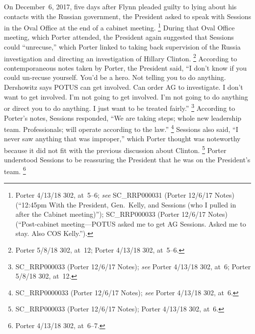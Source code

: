On December~6, 2017, five days after Flynn pleaded guilty to lying about his contacts with the Russian government, the President asked to speak with Sessions in the Oval Office at the end of a cabinet meeting.%
\footnote{Porter 4/13/18 302, at~5--6;
\textit{see} SC\_RRP000031 (Porter 12/6/17 Notes) (``12:45pm With the President, Gen.~Kelly, and Sessions (who I pulled in after the Cabinet meeting)'');
SC\_RRP000033 (Porter 12/6/17 Notes) (``Post-cabinet meeting---POTUS asked me to get AG Sessions.
Asked me to stay.
Also COS Kelly.'').}
During that Oval Office meeting, which Porter attended, the President again suggested that Sessions could ``unrecuse,'' which Porter linked to taking back supervision of the Russia investigation and directing an investigation of Hillary Clinton.%
\footnote{Porter 5/8/18 302, at~12;
Porter 4/13/18 302, at~5--6.}
According to contemporaneous notes taken by Porter, the President said, ``I don't know if you could un-recuse yourself.
You'd be a hero.
Not telling you to do anything.
Dershowitz says POTUS can get involved.
Can order AG to investigate.
I don't want to get involved.
I'm not going to get involved.
I'm not going to do anything or direct you to do anything.
I just want to be treated fairly.''%
\footnote{SC\_RRP000033 (Porter 12/6/17 Notes);
\textit{see} Porter 4/13/18 302, at~6;
Porter 5/8/18 302, at~12.}
According to Porter's notes, Sessions responded, ``We are taking steps; whole new leadership team.
Professionals; will operate according to the law.''%
\footnote{SC\_RRP0000033 (Porter 12/6/17 Notes);
\textit{see} Porter 4/13/18 302, at~6.}
Sessions also said, ``I never saw anything that was improper,'' which Porter thought was noteworthy because it did not fit with the previous discussion about Clinton.%
\footnote{SC\_RRP000033 (Porter 12/6/17 Notes);
Porter 4/13/18 302, at~6.}
Porter understood Sessions to be reassuring the President that he was on the President's team.%
\footnote{Porter 4/13/18 302, at~6--7.}

